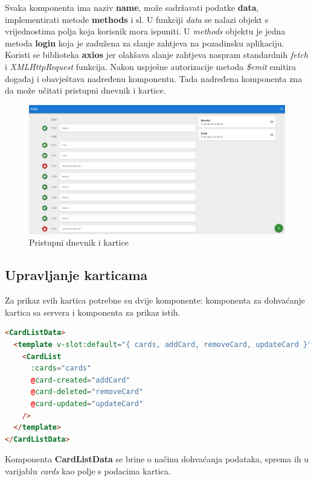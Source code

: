 Svaka komponenta ima naziv \textbf{name}, može sadržavati podatke \textbf{data}, implementirati metode \textbf{methods} i sl.
U funkciji \textit{data} se nalazi objekt s vrijednostima polja koja korisnik mora ispuniti.
U \textit{methods} objektu je jedna metoda \textbf{login} koja je zadužena za slanje zahtjeva na pozadinsku aplikaciju.
Koristi se biblioteka \textbf{axios} jer olakšava slanje zahtjeva naspram standardnih \textit{fetch} i \textit{XMLHttpRequest} funkcija.
Nakon uspješne autorizacije metoda \textit{\$emit} emitira događaj i obavještava nadređenu komponentu.
Tada nadređena komponenta zna da može učitati pristupni dnevnik i kartice.

\begin{figure}[h!]
    \centering
    \includegraphics[width=\textwidth]{images/primary-view}
    \caption{Pristupni dnevnik i kartice}
\end{figure}

\pagebreak

\subsection{Upravljanje karticama}

Za prikaz svih kartica potrebne su dvije komponente: komponenta za dohvaćanje kartica sa servera i komponenta za prikaz
istih.

\begin{lstlisting}[language=HTML]
<CardListData>
  <template v-slot:default="{ cards, addCard, removeCard, updateCard }">
    <CardList
      :cards="cards"
      @card-created="addCard"
      @card-deleted="removeCard"
      @card-updated="updateCard"
    />
  </template>
</CardListData>
\end{lstlisting}

Komponenta \textbf{CardListData} se brine o načinu dohvaćanja podataka, sprema ih u varijablu \textit{cards} kao polje
s podacima kartica.

